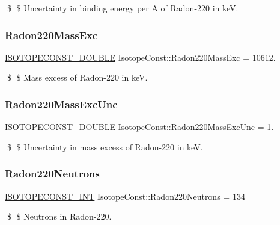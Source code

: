 \$ \$ Uncertainty in binding energy per A of Radon-\/220 in keV. \mbox{\label{group___isotope_const-_radon-_rn220_ga30ced21c95e2e41a390aa908af9b74c2}} 
\subsubsection{\texorpdfstring{Radon220\+Mass\+Exc}{Radon220MassExc}}
{\footnotesize\ttfamily \mbox{\hyperlink{group___isotope_const-_macros_ga8f45a7272ce02c0b4c65c44636ed719a}{I\+S\+O\+T\+O\+P\+E\+C\+O\+N\+S\+T\+\_\+\+D\+O\+U\+B\+LE}} Isotope\+Const\+::\+Radon220\+Mass\+Exc = 10612.}

\$ \$ Mass excess of Radon-\/220 in keV. \mbox{\label{group___isotope_const-_radon-_rn220_ga9e39cad1a3b294e2f3379f9ca5d0e7ea}} 
\subsubsection{\texorpdfstring{Radon220\+Mass\+Exc\+Unc}{Radon220MassExcUnc}}
{\footnotesize\ttfamily \mbox{\hyperlink{group___isotope_const-_macros_ga8f45a7272ce02c0b4c65c44636ed719a}{I\+S\+O\+T\+O\+P\+E\+C\+O\+N\+S\+T\+\_\+\+D\+O\+U\+B\+LE}} Isotope\+Const\+::\+Radon220\+Mass\+Exc\+Unc = 1.}

\$ \$ Uncertainty in mass excess of Radon-\/220 in keV. \mbox{\label{group___isotope_const-_radon-_rn220_ga23a5246308e427d0a6d4884c1f071cdb}} 
\subsubsection{\texorpdfstring{Radon220\+Neutrons}{Radon220Neutrons}}
{\footnotesize\ttfamily \mbox{\hyperlink{group___isotope_const-_macros_ga5f18360b3e99483a35c32d789e62621c}{I\+S\+O\+T\+O\+P\+E\+C\+O\+N\+S\+T\+\_\+\+I\+NT}} Isotope\+Const\+::\+Radon220\+Neutrons = 134}

\$ \$ Neutrons in Radon-\/220. \mbox{\label{group___isotope_const-_radon-_rn220_ga3ec19a2cfbd19966136ccb25ae9a53d2}} 
